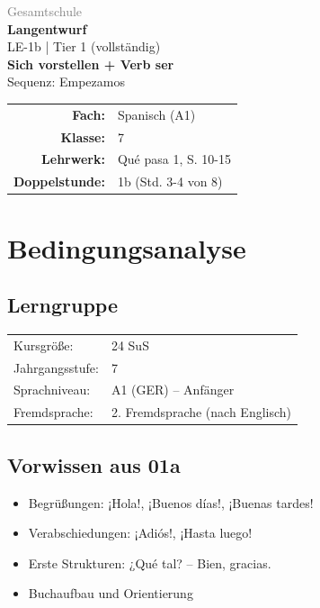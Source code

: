 \documentclass[11pt,a4paper]{article}
\newcommand{\fach}{Spanisch}
\newcommand{\jahrgangsstufe}{7}
\newcommand{\schulart}{Gesamtschule}
\newcommand{\stundenthema}{Sich vorstellen + Verb ser}
\newcommand{\reihenthema}{Empezamos}
\newcommand{\stundennummer}{1b}
\newcommand{\gerniveau}{A1}
\newcommand{\lehrwerk}{Qué pasa 1}
\newcommand{\lehrwerkseite}{S. 10-15}
\newcommand{\lerngruppengroesse}{24}
\begin{document}
\begin{titlepage}
    \centering
    \vspace*{2cm}
    {\large\textcolor{gray}{\schulart}}\\[2cm]
    {\Huge\textcolor{fach}{\textbf{Langentwurf}}}\\[0.5cm]
    {\large LE-\stundennummer{} | Tier 1 (vollständig)}\\[2cm]
    {\LARGE\textbf{\stundenthema}}\\[0.5cm]
    {\large Sequenz: \reihenthema}\\[2cm]
    \begin{tabular}{rl}
        \textbf{Fach:} & \fach{} (\gerniveau) \\[0.3cm]
        \textbf{Klasse:} & \jahrgangsstufe \\[0.3cm]
        \textbf{Lehrwerk:} & \lehrwerk, \lehrwerkseite \\[0.3cm]
        \textbf{Doppelstunde:} & \stundennummer{} (Std. 3-4 von 8) \\[0.3cm]
    \end{tabular}
    \vfill
\end{titlepage}

\tableofcontents
\newpage

\section{Bedingungsanalyse}

\subsection{Lerngruppe}
\begin{tabular}{ll}
    Kursgröße: & \lerngruppengroesse{} SuS \\
    Jahrgangsstufe: & \jahrgangsstufe \\
    Sprachniveau: & \gerniveau{} (GER) -- Anfänger \\
    Fremdsprache: & 2. Fremdsprache (nach Englisch) \\
\end{tabular}

\subsection{Vorwissen aus 01a}
\begin{itemize}
    \item Begrüßungen: ¡Hola!, ¡Buenos días!, ¡Buenas tardes!
    \item Verabschiedungen: ¡Adiós!, ¡Hasta luego!
    \item Erste Strukturen: ¿Qué tal? -- Bien, gracias.
    \item Buchaufbau und Orientierung
\end{itemize}
\end{document}

